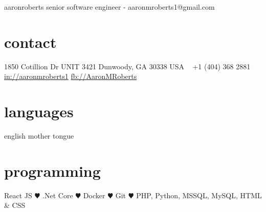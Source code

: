 \documentclass[]{friggeri-cv} %
\begin{document}
\header
{aaron}{roberts}
{senior software engineer - aaronmroberts1@gmail.com}


\begin{aside} %
\section{contact}
1850 Cotillion Dr
UNIT 3421
Dunwoody, GA 30338
USA
~
+1 (404) 368 2881
~
\href{https://www.linkedin.com/in/aaronmroberts1/}{in://aaronmroberts1}
\href{https://www.facebook.com/AaronMRoberts}{fb://AaronMRoberts}
\section{languages}
english mother tongue
\section{programming}
React JS {\color{red} $\varheartsuit$}
.Net Core {\color{red} $\varheartsuit$}
Docker {\color{red} $\varheartsuit$}
Git {\color{red} $\varheartsuit$}
PHP, Python, MSSQL, MySQL, HTML \& CSS
\end{aside}

\end{document}
